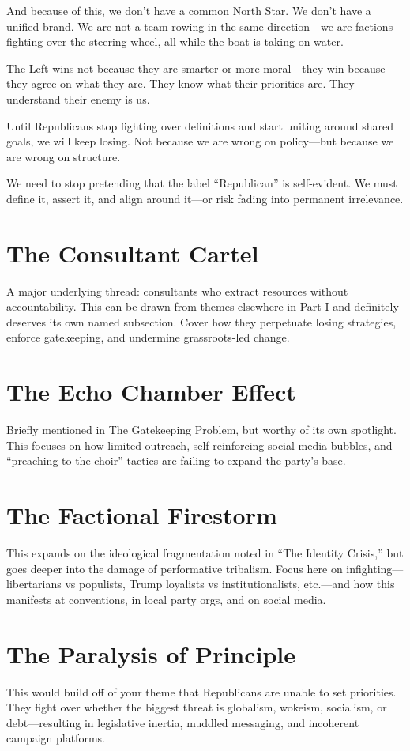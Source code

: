 And because of this, we don’t have a common North Star. We don’t have a unified brand. We are not a team rowing in the same direction—we are factions fighting over the steering wheel, all while the boat is taking on water.

The Left wins not because they are smarter or more moral—they win because they agree on what they are. They know what their priorities are. They understand their enemy is us.

Until Republicans stop fighting over definitions and start uniting around shared goals, we will keep losing. Not because we are wrong on policy—but because we are wrong on structure.

We need to stop pretending that the label “Republican” is self-evident. We must define it, assert it, and align around it—or risk fading into permanent irrelevance.

\section{The Consultant Cartel}
A major underlying thread: consultants who extract resources without accountability. This can be drawn from themes elsewhere in Part I and definitely deserves its own named subsection. Cover how they perpetuate losing strategies, enforce gatekeeping, and undermine grassroots-led change.
\section{The Echo Chamber Effect}
Briefly mentioned in The Gatekeeping Problem, but worthy of its own spotlight. This focuses on how limited outreach, self-reinforcing social media bubbles, and “preaching to the choir” tactics are failing to expand the party's base.
\section{The Factional Firestorm}
This expands on the ideological fragmentation noted in “The Identity Crisis,” but goes deeper into the damage of performative tribalism. Focus here on infighting—libertarians vs populists, Trump loyalists vs institutionalists, etc.—and how this manifests at conventions, in local party orgs, and on social media.
\section{The Paralysis of Principle}
This would build off of your theme that Republicans are unable to set priorities. They fight over whether the biggest threat is globalism, wokeism, socialism, or debt—resulting in legislative inertia, muddled messaging, and incoherent campaign platforms.

